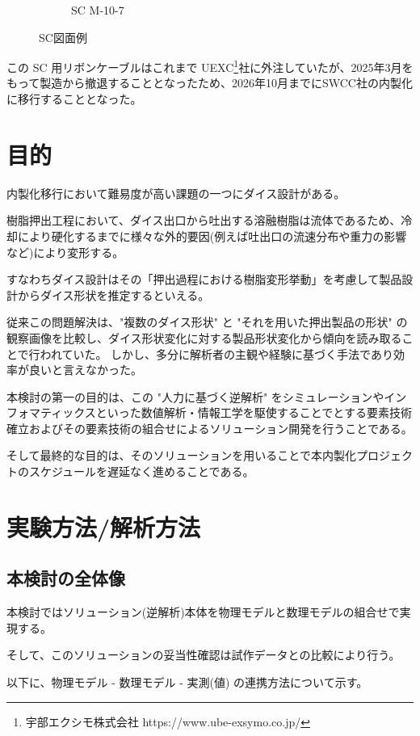\documentclass[report]{jlreq}
\begin{document}
\begin{figure}
\begin{subfigure}{0.45\columnwidth}
    \caption{SC M-10-7}
    \label{fig:SC_M-10-7}
    \end{subfigure}
    \caption{SC図面例}
    \label{fig:DesignDrawings} 
\end{figure} 


この SC 用リボンケーブルはこれまで UEXC\footnote{宇部エクシモ株式会社 https://www.ube-exsymo.co.jp/}社に外注していたが、2025年3月をもって製造から撤退することとなったため、2026年10月までにSWCC社の内製化に移行することとなった。

\chapter{目的}
内製化移行において難易度が高い課題の一つにダイス設計がある。

樹脂押出工程において、ダイス出口から吐出する溶融樹脂は流体であるため、冷却により硬化するまでに様々な外的要因({\small 例えば吐出口の流速分布や重力の影響など})により変形する。

すなわちダイス設計はその「押出過程における樹脂変形挙動」を考慮して製品設計からダイス形状を推定するといえる。

従来この問題解決は、"複数のダイス形状" と "それを用いた押出製品の形状" の観察画像を比較し、ダイス形状変化に対する製品形状変化から傾向を読み取ることで行われていた。
しかし、多分に解析者の主観や経験に基づく手法であり効率が良いと言えなかった。

本検討の第一の目的は、この "人力に基づく逆解析" をシミュレーションやインフォマティックスといった数値解析・情報工学を駆使することでとする要素技術確立およびその要素技術の組合せによるソリューション開発を行うことである。

そして最終的な目的は、そのソリューションを用いることで本内製化プロジェクトのスケジュールを遅延なく進めることである。


\chapter{実験方法/解析方法}
\section{本検討の全体像}
本検討ではソリューション({\small 逆解析})本体を物理モデルと数理モデルの組合せで実現する。

そして、このソリューションの妥当性確認は試作データとの比較により行う。

以下に、物理モデル - 数理モデル - 実測({\small 値}) の連携方法について示す。
\end{document}
